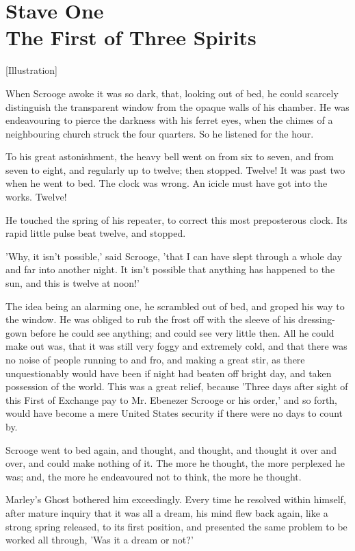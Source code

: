 \chapter{Stave One\\The First of Three Spirits}
[Illustration]

When Scrooge awoke it was so dark, that, looking out of bed, he could
scarcely distinguish the transparent window from the opaque walls of his
chamber. He was endeavouring to pierce the darkness with his ferret
eyes, when the chimes of a neighbouring church struck the four quarters.
So he listened for the hour.

To his great astonishment, the heavy bell went on from six to seven, and
from seven to eight, and regularly up to twelve; then stopped. Twelve!
It was past two when he went to bed. The clock was wrong. An icicle must
have got into the works. Twelve!

He touched the spring of his repeater, to correct this most preposterous
clock. Its rapid little pulse beat twelve, and stopped.

'Why, it isn't possible,' said Scrooge, 'that I can have slept through a
whole day and far into another night. It isn't possible that anything
has happened to the sun, and this is twelve at noon!'

The idea being an alarming one, he scrambled out of bed, and groped his
way to the window. He was obliged to rub the frost off with the sleeve
of his dressing-gown before he could see anything; and could see very
little then. All he could make out was, that it was still very foggy and
extremely cold, and that there was no noise of people running to and
fro, and making a great stir, as there unquestionably would have been if
night had beaten off bright day, and taken possession of the world. This
was a great relief, because 'Three days after sight of this First of
Exchange pay to Mr. Ebenezer Scrooge or his order,' and so forth, would
have become a mere United States security if there were no days to count
by.

Scrooge went to bed again, and thought, and thought, and thought it over
and over, and could make nothing of it. The more he thought, the more
perplexed he was; and, the more he endeavoured not to think, the more he
thought.

Marley's Ghost bothered him exceedingly. Every time he resolved within
himself, after mature inquiry that it was all a dream, his mind flew
back again, like a strong spring released, to its first position, and
presented the same problem to be worked all through, 'Was it a dream or
not?'

